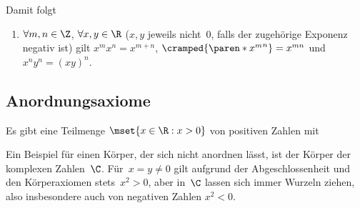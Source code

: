 \documentclass[a4paper]{article}
\begin{document}
Damit folgt
\begin{enumerate}[resume*=conclusions]
    \item $\forall m, n \in \Z$, $\forall x, y \in \R$ ($x, y$ jeweils nicht~$0$, falls der zugehörige Exponenz negativ ist) gilt $x^m x^n = x^{m+n}$, $\cramped{\paren*{x^m}^n} = x^{mn}$ und $x^n y^n = (xy)^n$.
\end{enumerate}

\subsection{Anordnungsaxiome}

\begin{axiom}[Anordnungsaxiome]
    Es gibt eine Teilmenge $\mset{x \in \R : x > 0}$ von positiven Zahlen mit
\end{axiom}

Ein Beispiel für einen Körper, der sich nicht anordnen lässt, ist der Körper der komplexen Zahlen~$\C$. Für~$x = y \neq 0$ gilt aufgrund der Abgeschlossenheit und den Körperaxiomen stets~$x^2 > 0$, aber in~$\C$ lassen sich immer Wurzeln ziehen, also insbesondere auch von negativen Zahlen $x^2 < 0$.
\end{document}
